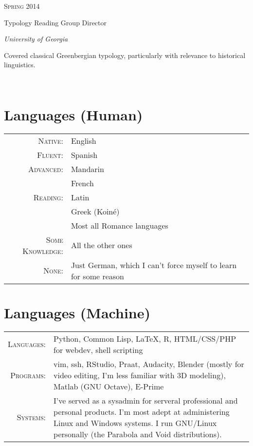 \documentclass[letterpaper,10pt]{article}
\newcommand{\entry}[4]{

\begin{minipage}[t]{.15\textwidth}
\hfill \textsc{#1}
\end{minipage}
\hfill\vline\hfill
\begin{minipage}[t]{.80\textwidth}
#2

\textit{#3}

\footnotesize{#4}
\end{minipage}\\\vspace{.25cm}}
\newcommand{\uga}{University of Georgia}
\begin{document}
\entry{Spring 2014}{Typology Reading Group Director}{\uga}{Covered classical Greenbergian typology, particularly with relevance to historical linguistics.}


\section{Languages (Human)}

\begin{longtable}{rl}
\textsc{Native:}&English\\
\textsc{Fluent:}&Spanish\\
\textsc{Advanced:}&Mandarin\\
&French\\
\textsc{Reading:}&Latin\\
&Greek (Koin\'e)\\
&Most all Romance languages\\
\textsc{Some Knowledge:}&All the other ones\\
\textsc{None:}&Just German, which I can't force myself to learn for some reason
\end{longtable}

\section{Languages (Machine)}
\begin{longtable}{rp{12cm}}
\textsc{Languages:}&Python, Common Lisp, \LaTeX, R, HTML/CSS/PHP for webdev, shell scripting\\
\textsc{Programs:}&vim, ssh, RStudio, Praat, Audacity, Blender (mostly for video editing, I'm less familiar with 3D modeling), Matlab (GNU Octave), E-Prime\\	\textsc{Systems:}&I've served as a sysadmin for serveral professional and personal products. I'm most adept at administering Linux and Windows systems. I run GNU/Linux personally (the Parabola and Void distributions).
\end{longtable}
\end{document}

